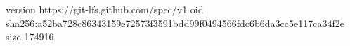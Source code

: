 version https://git-lfs.github.com/spec/v1
oid sha256:a52ba728c86343159e72573f3591bdd99f0494566fdc6b6da3cc5e117ca34f2e
size 174916

